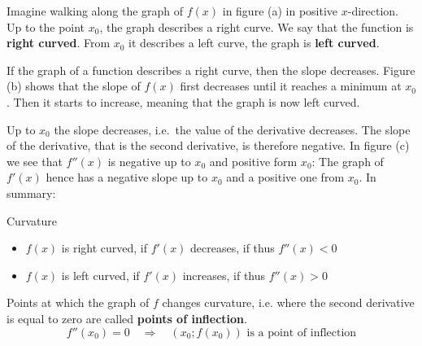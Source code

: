 \documentclass[12pt,eng]{skript_ogg}
\begin{document}
\vspace{-3mm}

Imagine walking along the graph of $f(x)$ in figure (a) in positive $x$-direction. Up to the point $x_0$, the graph describes a right curve. We say that the function is \textbf{right curved}. From $x_0$ it describes a left curve, the graph is \textbf{left curved}.

If the graph of a function describes a right curve, then the slope decreases. Figure (b) shows that the slope of $f(x)$ first decreases until it reaches a minimum at $x_0$. Then it starts to increase, meaning that the graph is now left curved.

Up to $x_0$ the slope decreases, i.e.\ the value of the derivative decreases. The slope of the derivative, that is the second derivative, is therefore negative. In figure (c) we see that $f''(x)$ is negative up to $x_0$ and positive form $x_0$: The graph of $f'(x)$ hence has a negative slope up to $x_0$ and a positive one from $x_0$. In summary:
\begin{satz} Curvature

\begin{itemize}
\item $f(x)$ is right curved, if $f'(x)$ decreases, if thus $f''(x)<0$
\item $f(x)$ is left curved, if $f'(x)$ increases, if thus $f''(x)>0$
\end{itemize} 
\end{satz}

\begin{defn}
Points at which the graph of $f$ changes curvature, i.e. where the second derivative is equal to zero are called \textbf{points of inflection}.
\[f''(x_0)=0\quad\Rightarrow\quad (x_0;f(x_0))\text{ is a point of inflection}\]
\end{defn}
\end{document}
